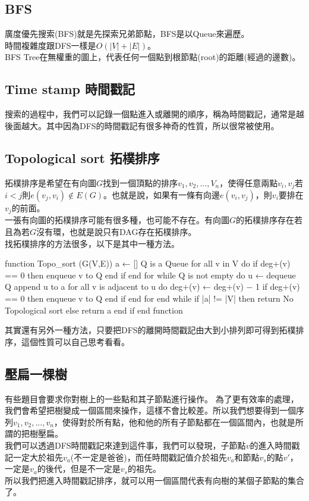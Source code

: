 \documentclass{article}
\begin{document}
\subsection{BFS}
廣度優先搜索(BFS)就是先探索兄弟節點，BFS是以Queue來遍歷。\\
時間複雜度跟DFS一樣是$O(|V|+|E|)$。\\[2em]
BFS Tree在無權重的圖上，代表任何一個點到根節點(root)的距離(經過的邊數)。

\subsection{Time stamp 時間戳記}
搜索的過程中，我們可以記錄一個點進入或離開的順序，稱為時間戳記，通常是越後面越大。其中因為DFS的時間戳記有很多神奇的性質，所以很常被使用。

\subsection{Topological sort 拓樸排序}
拓樸排序是希望在有向圖$G$找到一個頂點的排序$v_1,v_2,...,V_n$，使得任意兩點$v_i,v_j$若$i<j$則$e(v_j,v_i) \notin E(G)$。也就是說，如果有一條有向邊$e(v_i,v_j)$，則$v_i$要排在$v_j$的前面。\\
一張有向圖的拓樸排序可能有很多種，也可能不存在。有向圖$G$的拓樸排序存在若且為若$G$沒有環，也就是說只有DAG存在拓樸排序。\\
找拓樸排序的方法很多，以下是其中一種方法。
\begin{algorithm}[caption={Topo sort}, label={alg1}]
function Topo_sort (G(V,E))
    a ← []
    Q is a Queue
    for all v in V do
        if deg+(v) == 0 then
            enqueue v to Q
        end if
    end for
    while Q is not empty do
        u ← dequeue Q
        append u to a
        for all v is adjacent to u do
            deg+(v) ← deg+(v) − 1
            if deg+(v) == 0 then
                enqueue v to Q
            end if
        end for
    end while
    if |a| != |V| then
        return No Topological sort
    else
        return a
    end if
end function
\end{algorithm}
其實還有另外一種方法，只要把DFS的離開時間戳記由大到小排列即可得到拓樸排序，這個性質可以自己思考看看。

\subsection{壓扁一棵樹}
有些題目會要求你對樹上的一些點和其子節點進行操作。
為了更有效率的處理，我們會希望把樹變成一個區間來操作，這樣不會比較差。所以我們想要得到一個序列$v_1,v_2,...,v_n$，使得對於所有點，他和他的所有子節點都在一個區間內，也就是所謂的把樹壓扁。\\[2em]
我們可以透過DFS時間戳記來達到這件事，我們可以發現，子節點$v$的進入時間戳記一定大於祖先$v_a$(不一定是爸爸)，而任時間戳記值介於祖先$v_a$和節點$v_s$的點$v'$，一定是$v_a$的後代，但是不一定是$v_s$的祖先。\\
所以我們把進入時間戳記排序，就可以用一個區間代表有向樹的某個子節點的集合了。
\end{document}
